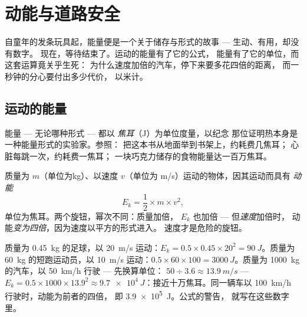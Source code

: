 \chapter{动能与道路安全}\label{ch:g9:kinetic-energy-safety}

自童年的发条玩具起，能量便是一个关于储存与形式的故事 ---
生动、有用，却没有数字。
现在，等待结束了。运动的能量有了它的公式，
能量有了它的单位，而这套运算竟关乎生死：
为什么速度加倍的汽车，停下来要多花四倍的距离，
而一秒钟的分心要付出多少代价，
以米计。

\section{运动的能量}

\begin{definition}[焦耳]\label{def:g9:kinetic-energy-safety:joule}
能量 --- 无论哪种形式 --- 都以
\emph{焦耳}（\unit{J}）为单位度量，以纪念
那位证明热本身是一种能量形式的实验家。参照：
把这本书从地面举到书架上，约耗费几焦耳；
心脏每跳一次，约耗费一焦耳；
一块巧克力储存的食物能量达一百万焦耳。
\end{definition}

\begin{proposition}[动能]\label{prop:g9:kinetic-energy-safety:formula}
质量为 $m$（单位为\unit{kg}）、以速度 $v$（单位为
\unit{m/s}）运动的物体，因其运动而具有
\emph{动能}
\[
E_k = \frac{1}{2} \times m \times v^2 ,
\]
单位为焦耳。两个旋钮，幂次不同：质量加倍，
$E_k$ 也加倍 --- 但\emph{速度}加倍时，
动能\emph{变为四倍}，因为速度以平方的形式进入。
速度才是危险的旋钮。
\end{proposition}

\begin{example}[初步计算]\label{ex:g9:kinetic-energy-safety:first}
质量为 \qty{0.45}{kg} 的足球，以 \qty{20}{m/s} 运动：$E_k = 0.5 \times
0.45 \times 20^2 = \qty{90}{J}$。质量为 \qty{60}{kg} 的短跑运动员，以
\qty{10}{m/s} 运动：$0.5 \times 60 \times 100 = \qty{3000}{J}$。质量为
\qty{1000}{kg} 的汽车，以 \qty{50}{km/h} 行驶 --- 先换算单位：
$50 \div 3.6 \approx \qty{13.9}{m/s}$ --- $E_k = 0.5 \times
1000 \times 13.9^2 \approx \qty{9.7e4}{J}$：接近十万焦耳。同一辆车以
\qty{100}{km/h} 行驶时，动能为前者的四倍，
即 \qty{3.9e5}{J}。公式的警告，
就写在这些数字里。
\end{example}

